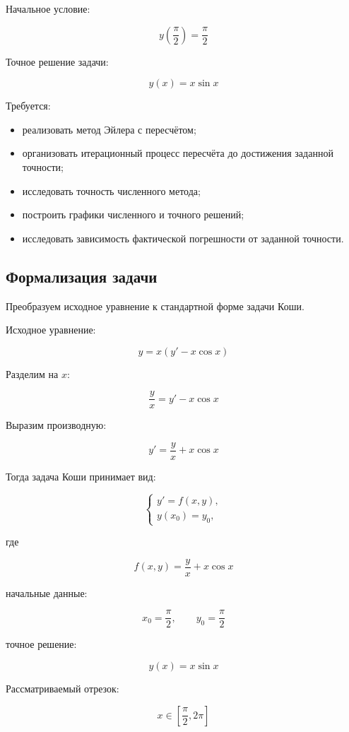 \documentclass[14pt]{extarticle}
\begin{document}
	Начальное условие:
	
	\[
	y\left(\frac{\pi}{2}\right)=\frac{\pi}{2}
	\]
	
	Точное решение задачи:
	
	\[
	y(x)=x\sin x
	\]
	
	Требуется:
	
	\begin{itemize}
		\item реализовать метод Эйлера с пересчётом;
		\item организовать итерационный процесс пересчёта
		до достижения заданной точности;
		\item исследовать точность численного метода;
		\item построить графики численного и точного решений;
		\item исследовать зависимость фактической погрешности
		от заданной точности.
	\end{itemize}
	
	\subsection{Формализация задачи}
	
	Преобразуем исходное уравнение к стандартной форме задачи Коши.
	
	Исходное уравнение:
	
	\[
	y = x(y' - x\cos x)
	\]
	
	Разделим на $x$:
	
	\[
	\frac{y}{x}=y'-x\cos x
	\]
	
	Выразим производную:
	
	\[
	y'=\frac{y}{x}+x\cos x
	\]
	
	Тогда задача Коши принимает вид:
	
	\[
	\begin{cases}
		y' = f(x,y), \\
		y(x_0)=y_0,
	\end{cases}
	\]
	
	где
	
	\[
	f(x,y)=\frac{y}{x}+x\cos x
	\]
	
	начальные данные:
	
	\[
	x_0=\frac{\pi}{2},
	\qquad
	y_0=\frac{\pi}{2}
	\]
	
	точное решение:
	
	\[
	y(x)=x\sin x
	\]
	
	Рассматриваемый отрезок:
	
	\[
	x\in\left[\frac{\pi}{2},2\pi\right]
	\]
	
\end{document}
